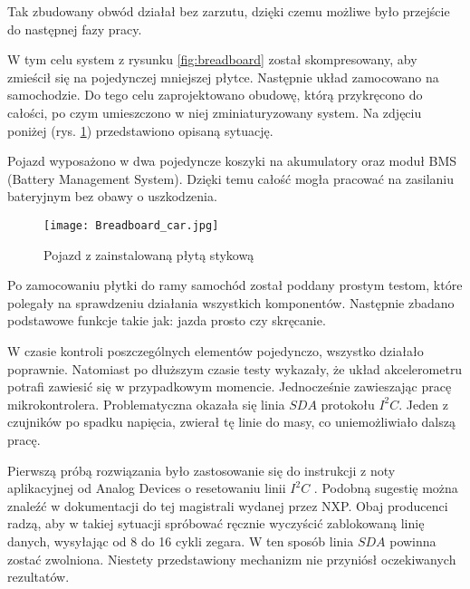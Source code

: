         Tak zbudowany obwód działał bez zarzutu, dzięki czemu możliwe było przejście do następnej fazy pracy.

        W tym celu system z rysunku \ref{fig:breadboard} został skompresowany, aby zmieścił się na pojedynczej mniejszej płytce.
        Następnie układ zamocowano na samochodzie.
        Do tego celu zaprojektowano obudowę, którą przykręcono do całości, po czym umieszczono w niej zminiaturyzowany system.
        Na zdjęciu poniżej (rys. \ref{fig:breadboard_car}) przedstawiono opisaną sytuację.

        Pojazd wyposażono w dwa pojedyncze koszyki na akumulatory oraz moduł BMS (Battery Management System).
        Dzięki temu całość mogła pracować na zasilaniu bateryjnym bez obawy o uszkodzenia.

        \begin{figure}[!ht]
            \centering
            \texttt{[image: Breadboard\_car.jpg]}
            \caption{Pojazd z zainstalowaną płytą stykową}
            \label{fig:breadboard_car}
        \end{figure}

        Po zamocowaniu płytki do ramy samochód został poddany prostym testom, które polegały na sprawdzeniu działania wszystkich komponentów.
        Następnie zbadano podstawowe funkcje takie jak: jazda prosto czy skręcanie.

        W czasie kontroli poszczególnych elementów pojedynczo, wszystko działało poprawnie.
        Natomiast po dłuższym czasie testy wykazały, że układ akcelerometru potrafi zawiesić się w przypadkowym momencie.
        Jednocześnie zawieszając pracę mikrokontrolera.
        Problematyczna okazała się linia $SDA$ protokołu $I^2C$.
        Jeden z czujników po spadku napięcia, zwierał tę linie do masy, co uniemożliwiało dalszą pracę.

        Pierwszą próbą rozwiązania było zastosowanie się do instrukcji z noty aplikacyjnej od Analog Devices o resetowaniu linii $I^2C$ \cite{application_note_I2C_AD}.
        Podobną sugestię można znaleźć w dokumentacji do tej magistrali \cite{I2C_manual_NXP} wydanej przez NXP.
        Obaj producenci radzą, aby w takiej sytuacji spróbować ręcznie wyczyścić zablokowaną linię danych, wysyłając od 8 do 16 cykli zegara.
        W ten sposób linia $SDA$ powinna zostać zwolniona.
        Niestety przedstawiony mechanizm nie przyniósł oczekiwanych rezultatów.

